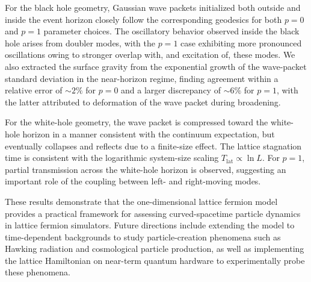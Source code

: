 \documentclass[reprint,amsmath,amssymb,aps,prb]{revtex4-2}
\begin{document}
For the black hole geometry, Gaussian wave packets initialized both outside and inside the event horizon closely follow the corresponding geodesics for both $p=0$ and $p=1$ parameter choices. The oscillatory behavior observed inside the black hole arises from doubler modes, with the $p=1$ case exhibiting more pronounced oscillations owing to stronger overlap with, and excitation of, these modes. We also extracted the surface gravity from the exponential growth of the wave-packet standard deviation in the near-horizon regime, finding agreement within a relative error of $\sim 2\%$ for $p=0$ and a larger discrepancy of $\sim 6\%$ for $p=1$, with the latter attributed to deformation of the wave packet during broadening.

For the white-hole geometry, the wave packet is compressed toward the white-hole horizon in a manner consistent with the continuum expectation, but eventually collapses and reflects due to a finite-size effect. The lattice stagnation time is consistent with the logarithmic system-size scaling $T_{\mathrm{lat}}\propto\ln L$. For $p=1$, partial transmission across the white-hole horizon is observed, suggesting an important role of the coupling between left- and right-moving modes.

These results demonstrate that the one-dimensional lattice fermion model provides a practical framework for assessing curved-spacetime particle dynamics in lattice fermion simulators. Future directions include extending the model to time-dependent backgrounds to study particle-creation phenomena such as Hawking radiation and cosmological particle production, as well as implementing the lattice Hamiltonian on near-term quantum hardware to experimentally probe these phenomena.


\end{document}
